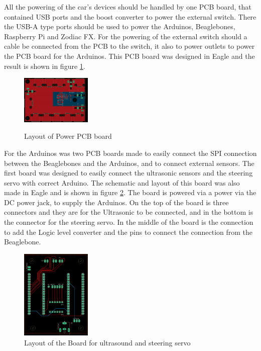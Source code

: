 \documentclass[11pt, titlepage]{article} %
\begin{document}
All the powering of the car's devices should be handled by one PCB board, that contained USB ports and the boost converter to power the external switch. There the USB-A type ports should be used to power the Arduinos, Beaglebones, Raspberry Pi and Zodiac FX. For the powering of the external switch should a cable be connected from the PCB to the switch, it also to power outlets to power the PCB board for the Arduinos. This PCB board was designed in Eagle and the result is shown in figure \ref{fig:power_pcb_layout}. 

\begin{figure}
	\includegraphics[width=0.3\textwidth]{power_board_layout.png}
	\label{fig:power_pcb_layout}
	\caption{Layout of Power PCB board}
\end{figure}

For the Arduinos was two PCB boards made to easily connect the SPI connection between the Beaglebones and the Arduinos, and to connect external sensors. The first board was designed to easily connect the ultrasonic sensors and the steering servo with correct Arduino. The schematic and layout of this board was also made in Eagle and is shown in figure \ref{fig:board_layout_ultra_servo}. The board is powered via a power via the DC power jack, to supply the Arduinos. On the top of the board is three connectors and they are for the Ultrasonic to be connected, and in the bottom is the connector for the steering servo. In the middle of the board is the connection to add the Logic level converter and the pins to connect the connection from the Beaglebone. 

\begin{figure}
	\includegraphics[width=0.3\textwidth]{borad_layout_seervo_ultra.png}
	\caption{Layout of the Board for ultrasound and steering servo}
	\label{fig:board_layout_ultra_servo}
\end{figure}
\end{document}
